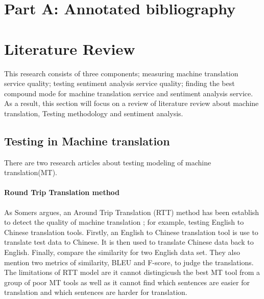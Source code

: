 \documentclass[conference]{IEEEtran}
\begin{document}
\section{Part A: Annotated bibliography}
\nocite{*}


\section{Literature Review}
This research consists of three components; measuring machine translation
service quality; testing sentiment analysis service quality;
finding the best compound mode for machine translation service and
sentiment analysis service.
As a result, this section will focus on a review of literature review about machine
translation, Testing methodology and sentiment analysis.
\subsection{Testing in Machine translation}
There are two research articles about testing modeling of machine
translation(MT).

\paragraph{Round Trip Translation method}
As Somers argues, an Around Trip Translation (RTT) method has been establish to
detect the quality of machine translation \cite{roundTripTranslation}; for example, testing English to Chinese translation tools.
Firstly, an English to Chinese translation tool is use to translate test data to
Chinese. It is then used to translate Chinese data back to English.
Finally, compare the similarity for two English data set.
They also mention two metrics of similarity, BLEU and F-score, to judge the
translations. The limitations of RTT model are it cannot distingicush the best
MT tool from a group of poor MT tools as well as it cannot find which sentences are easier for
translation and which sentences are harder for translation.
\end{document}

